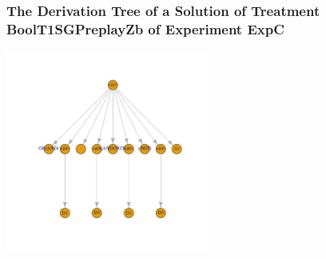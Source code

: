  \begin{frame}
 \frametitle{ The Derivation Tree of a Solution of Treatment BoolT1SGPreplayZb of Experiment ExpC }
 \begin{center}
\includegraphics[width=0.5\textwidth, angle=0]
{ExpCDerivationTreeFigure003.pdf}
 \end{center}
 \label{report/ExpCDerivationTreeFigure003.pdf}  
 \end{frame}

